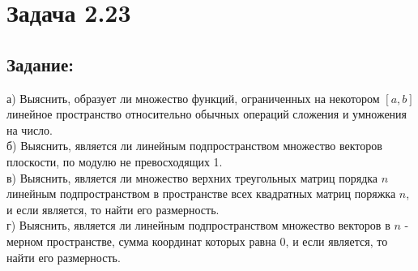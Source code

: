 \section{Задача 2.23}
\subsection{Задание:}
а) Выяснить, образует ли множество функций, ограниченных на некотором $ [a, b] $
линейное пространство относительно обычных операций сложения и умножения на число.
\\
б) Выяснить, является ли линейным подпространством множество векторов плоскости, по модулю не превосходящих 1.
\\
в) Выяснить, является ли множество верхних треугольных матриц порядка $ n $ линейным подпространством
в пространстве всех квадратных матриц поряжка $ n $, и если является, то найти его размерность.
\\
г) Выяснить, является ли линейным подпространством множество векторов в $ n $ - мерном пространстве,
сумма координат которых равна 0, и если является, то найти его размерность.
